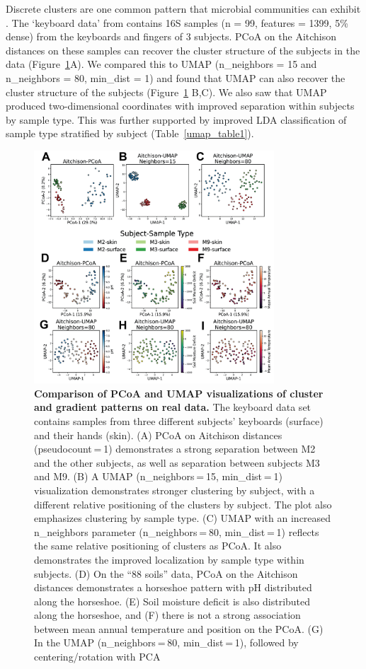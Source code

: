 Discrete clusters are one common pattern that microbial communities can exhibit \cite{Kuczynski2010-gu}. The `keyboard data' from \cite{Fierer2010-dp} contains 16S samples (n = 99, features  = 1399, 5\% dense) from the keyboards and fingers of 3 subjects. PCoA on the Aitchison distances on these samples can recover the cluster structure of the subjects in the data (Figure~\ref{umap_fig1}A). We compared this to UMAP (n\_neighbors = 15 and n\_neighbors = 80, min\_dist = 1) and found that UMAP can also recover the cluster structure of the subjects (Figure~\ref{umap_fig1} B,C). We also saw that UMAP produced two-dimensional coordinates with improved separation within subjects by sample type. This was further supported by improved LDA classification of sample type stratified by subject (Table~\ref{umap_table1}).


\begin{figure}[htbp]
\centering
\includegraphics[width=0.8\textwidth]{umap-figures/figure01.png}
\caption[Comparison of PCoA and UMAP visualizations of cluster and gradient patterns on real data.]{\textbf{ Comparison of PCoA and UMAP visualizations of cluster and gradient patterns on real data. } The keyboard data set contains samples from three different subjects’ keyboards (surface) and their hands (skin). (A) PCoA on Aitchison distances (pseudocount = 1) demonstrates a strong separation between M2 and the other subjects, as well as separation between subjects M3 and M9. (B) A UMAP (n\_neighbors = 15, min\_dist = 1) visualization demonstrates stronger clustering by subject, with a different relative positioning of the clusters by subject. The plot also emphasizes clustering by sample type. (C) UMAP with an increased n\_neighbors parameter (n\_neighbors = 80, min\_dist = 1) reflects the same relative positioning of clusters as PCoA. It also demonstrates the improved localization by sample type within subjects. (D) On the “88 soils” data, PCoA on the Aitchison distances demonstrates a horseshoe pattern with pH distributed along the horseshoe. (E) Soil moisture deficit is also distributed along the horseshoe, and (F) there is not a strong association between mean annual temperature and position on the PCoA. (G) In the UMAP (n\_neighbors = 80, min\_dist = 1), followed by centering/rotation with PCA }
\label{umap_fig1}
\end{figure}

